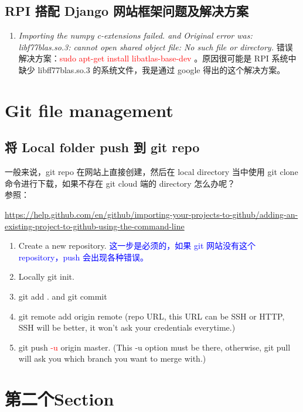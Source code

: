 \documentclass[UTF8,fancyhdr,a4paper]{ctexart}
\begin{document}
\subsection{RPI 搭配 Django 网站框架问题及解决方案}
\begin{enumerate}
      \item \emph{Importing the numpy c-extensions failed. and Original error was: libf77blas.so.3: cannot open shared object file: No such file or directory.} 错误解决方案：\textcolor{red}{sudo apt-get install libatlas-base-dev} 。原因很可能是 RPI 系统中缺少 libff77blas.so.3 的系统文件，我是通过 google 得出的这个解决方案。
\end{enumerate}






\newpage
\section{Git file management}
\subsection{将 Local folder push 到 git repo}
一般来说，git repo 在网站上直接创建，然后在 local directory 当中使用 git clone 命令进行下载，如果不存在 git cloud 端的 directory 怎么办呢？\\
参照：\begin{sloppypar}\url{https://help.github.com/en/github/importing-your-projects-to-github/adding-an-existing-project-to-github-using-the-command-line}\end{sloppypar}
\begin{enumerate}
      \item Create a new repository. \textcolor{blue}{这一步是必须的，如果 git 网站没有这个 repository，push 会出现各种错误。}
      \item Locally git init.
      \item git add . and git commit
      \item git remote add origin remote (repo URL, this URL can be SSH or HTTP, SSH will be better, it won't ask your credentials everytime.)
      \item git push \textcolor{red}{-u} origin master. (This -u option must be there, otherwise, git pull will ask you which branch you want to merge with.)
\end{enumerate}


\newpage
\section{第二个Section}
\end{document}
